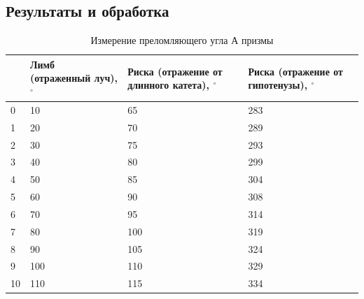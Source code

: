 \documentclass[12pt]{article}
\begin{document}
    \subsection*{Результаты и обработка}
    \begin{table}[h]
        \centering
        \caption{Измерение преломляющего угла А призмы}
        \label{tab:tab1}
        \begin{tabular}{|p{0.5cm}|p{3cm}|p{4cm}|p{4cm}|}
            \hline
            {} & Лимб (отраженный луч), $^{\circ}$ & Риска (отражение от длинного катета), $^{\circ}$ & Риска (отражение от гипотенузы), $^{\circ}$ \\\hline
            0  & 10                                & 65                                               & 283                                         \\
            1  & 20                                & 70                                               & 289                                         \\
            2  & 30                                & 75                                               & 293                                         \\
            3  & 40                                & 80                                               & 299                                         \\
            4  & 50                                & 85                                               & 304                                         \\
            5  & 60                                & 90                                               & 308                                         \\
            6  & 70                                & 95                                               & 314                                         \\
            7  & 80                                & 100                                              & 319                                         \\
            8  & 90                                & 105                                              & 324                                         \\
            9  & 100                               & 110                                              & 329                                         \\
            10 & 110                               & 115                                              & 334                                         \\

\end{tabular}
\end{table}
\end{document}
